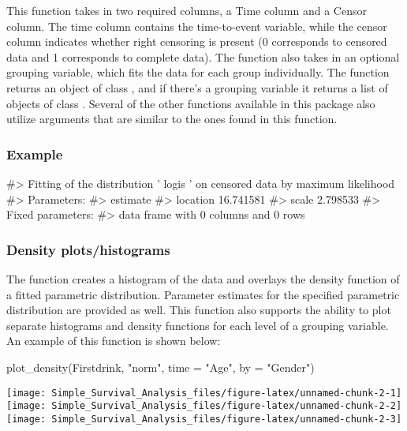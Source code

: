 This function takes in two required columns, a Time column and a Censor
column. The time column contains the time-to-event variable, while the
censor column indicates whether right censoring is present (0
corresponds to censored data and 1 corresponds to complete data). The
function also takes in an optional grouping variable, which fits the
data for each group individually. The function returns an object of
class , and if there's a grouping variable it returns
a list of objects of class . Several of the other
functions available in this package also utilize arguments that are
similar to the ones found in this function.

\hypertarget{example}{%
\subsubsection{Example}\label{example}}

\begin{Schunk}
\begin{Soutput}
#> Fitting of the distribution ' logis ' on censored data by maximum likelihood 
#> Parameters:
#>           estimate
#> location 16.741581
#> scale     2.798533
#> Fixed parameters:
#> data frame with 0 columns and 0 rows
\end{Soutput}
\end{Schunk}

\hypertarget{density-plotshistograms}{%
\subsubsection{Density plots/histograms}\label{density-plotshistograms}}

The  function creates a histogram of the data and
overlays the density function of a fitted parametric distribution.
Parameter estimates for the specified parametric distribution are
provided as well. This function also supports the ability to plot
separate histograms and density functions for each level of a grouping
variable. An example of this function is shown below:

\begin{Schunk}
\begin{Sinput}
plot_density(Firstdrink, "norm", time = "Age", by = "Gender")
\end{Sinput}

\texttt{[image: Simple\_Survival\_Analysis\_files/figure-latex/unnamed-chunk-2-1]} 
\texttt{[image: Simple\_Survival\_Analysis\_files/figure-latex/unnamed-chunk-2-2]} 
\texttt{[image: Simple\_Survival\_Analysis\_files/figure-latex/unnamed-chunk-2-3]} \end{Schunk}

